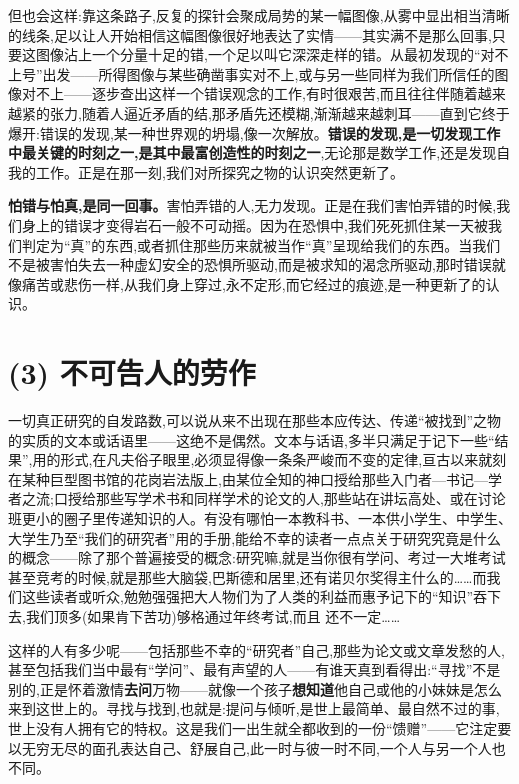 但也会这样:靠这条路子,反复的探针会聚成局势的某一幅图像,从雾中显出相当清晰的线条,足以让人开始相信这幅图像很好地表达了实情——其实满不是那么回事,只要这图像沾上一个分量十足的错,一个足以叫它深深走样的错。从最初发现的“对不上号”出发——所得图像与某些确凿事实对不上,或与另一些同样为我们所信任的图像对不上——逐步查出这样一个错误观念的工作,有时很艰苦,而且往往伴随着越来越紧的张力,随着人逼近矛盾的结,那矛盾先还模糊,渐渐越来越刺耳——直到它终于爆开:错误的发现,某一种世界观的坍塌,像一次解放。\textbf{错误的发现,是一切发现工作中最关键的时刻之一,是其中最富创造性的时刻之一},无论那是数学工作,还是发现自我的工作。正是在那一刻,我们对所探究之物的认识突然更新了。

\textbf{怕错与怕真,是同一回事。}害怕弄错的人,无力发现。正是在我们害怕弄错的时候,我们身上的错误才变得岩石一般不可动摇。因为在恐惧中,我们死死抓住某一天被我们判定为“真”的东西,或者抓住那些历来就被当作“真”呈现给我们的东西。当我们不是被害怕失去一种虚幻安全的恐惧所驱动,而是被求知的渴念所驱动,那时错误就像痛苦或悲伤一样,从我们身上穿过,永不定形,而它经过的痕迹,是一种更新了的认识。

\section{(3) 不可告人的劳作}

一切真正研究的自发路数,可以说从来不出现在那些本应传达、传递“被找到”之物的实质的文本或话语里——这绝不是偶然。文本与话语,多半只满足于记下一些“结果”,用的形式,在凡夫俗子眼里,必须显得像一条条严峻而不变的定律,亘古以来就刻在某种巨型图书馆的花岗岩法版上,由某位全知的神口授给那些入门者—书记—学者之流;口授给那些写学术书和同样学术的论文的人,那些站在讲坛高处、或在讨论班更小的圈子里传递知识的人。有没有哪怕一本教科书、一本供小学生、中学生、大学生乃至“我们的研究者”用的手册,能给不幸的读者一点点关于研究究竟是什么的概念——除了那个普遍接受的概念:研究嘛,就是当你很有学问、考过一大堆考试甚至竞考的时候,就是那些大脑袋,巴斯德和居里,还有诺贝尔奖得主什么的……而我们这些读者或听众,勉勉强强把大人物们为了人类的利益而惠予记下的“知识”吞下去,我们顶多(如果肯下苦功)够格通过年终考试,而且
还不一定……

 这样的人有多少呢——包括那些不幸的“研究者”自己,那些为论文或文章发愁的人,甚至包括我们当中最有“学问”、最有声望的人——有谁天真到看得出:“寻找”不是别的,正是怀着激情\textbf{去问}万物——就像一个孩子\textbf{想知道}他自己或他的小妹妹是怎么来到这世上的。寻找与找到,也就是:提问与倾听,是世上最简单、最自然不过的事,世上没有人拥有它的特权。这是我们一出生就全都收到的一份“馈赠”——它注定要以无穷无尽的面孔表达自己、舒展自己,此一时与彼一时不同,一个人与另一个人也不同。

